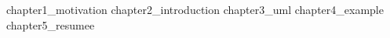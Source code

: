 % 
% 
{chapter1_motivation}
{chapter2_introduction}
{chapter3_uml}
\newpage
{chapter4_example}
\newpage
{chapter5_resumee}